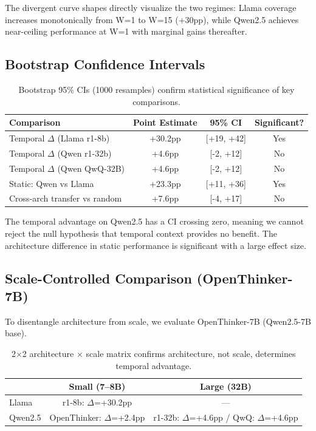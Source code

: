 \documentclass[11pt]{article}
\begin{document}
The divergent curve shapes directly visualize the two regimes: Llama coverage increases monotonically from W=1 to W=15 (+30pp), while Qwen2.5 achieves near-ceiling performance at W=1 with marginal gains thereafter.

\subsection{Bootstrap Confidence Intervals}

\begin{table}[h]
\centering
\caption{Bootstrap 95\% CIs (1000 resamples) confirm statistical significance of key comparisons.}
\label{tab:bootstrap}
\begin{tabular}{lccc}
\toprule
Comparison & Point Estimate & 95\% CI & Significant? \\
\midrule
Temporal $\Delta$ (Llama r1-8b) & +30.2pp & [+19, +42] & Yes \\
Temporal $\Delta$ (Qwen r1-32b) & +4.6pp & [-2, +12] & No \\
Temporal $\Delta$ (Qwen QwQ-32B) & +4.6pp & [-2, +12] & No \\
Static: Qwen vs Llama & +23.3pp & [+11, +36] & Yes \\
Cross-arch transfer vs random & +7.6pp & [-4, +17] & No \\
\bottomrule
\end{tabular}
\end{table}

The temporal advantage on Qwen2.5 has a CI crossing zero, meaning we cannot reject the null hypothesis that temporal context provides no benefit. The architecture difference in static performance is significant with a large effect size.

\subsection{Scale-Controlled Comparison (OpenThinker-7B)}

To disentangle architecture from scale, we evaluate OpenThinker-7B (Qwen2.5-7B base).

\begin{table}[h]
\centering
\caption{2$\times$2 architecture $\times$ scale matrix confirms architecture, not scale, determines temporal advantage.}
\label{tab:scale}
\begin{tabular}{lcc}
\toprule
 & Small (7--8B) & Large (32B) \\
\midrule
Llama & r1-8b: $\Delta$=+30.2pp & --- \\
Qwen2.5 & OpenThinker: $\Delta$=+2.4pp & r1-32b: $\Delta$=+4.6pp / QwQ: $\Delta$=+4.6pp \\
\bottomrule
\end{tabular}
\end{table}
\end{document}
